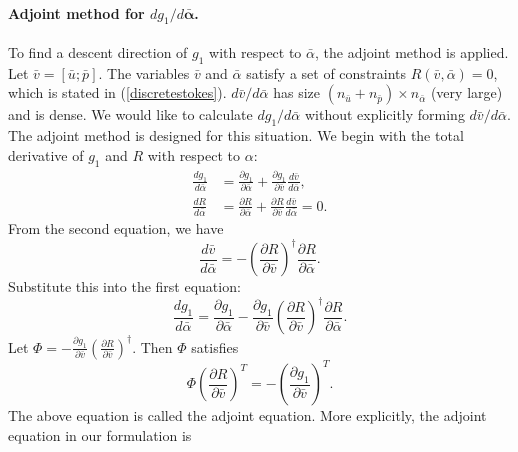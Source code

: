 \paragraph{Adjoint method for $d g_1/d \mathbf{\bar{\alpha}} $.}
To find a descent direction of $g_1$ with respect to $\bar{\alpha}$,
the adjoint method \cite{Jameson1999} is applied. Let $\bar{v} =
[\bar{u};\bar{p}]$. The variables $\bar{v}$ and $\bar{\alpha}$ satisfy
a set of constraints $R(\bar{v},\bar{\alpha})=0$, which is
stated in (\ref{discretestokes}). $d\bar{v}/d\bar{\alpha}$ has size
$(n_{\bar{u}}+n_{\bar{p}}) \times n_{\bar{\alpha}}$ (very large) and
is dense. We would like to calculate $d g_1/d\bar{\alpha}$ without
explicitly forming $d\bar{v}/d\bar{\alpha}$. The adjoint method is
designed for this situation. We begin with the total derivative of
$g_1$ and $R$ with respect to $\alpha$:
\begin{align*}
  \frac{dg_1}{d\bar{\alpha}} & =  \frac{\partial{g_1}}{\partial{\bar{\alpha}}}+
                                \frac{\partial{g_1}}{\partial{\bar{v}}} \frac{d\bar{v}}{d\bar{\alpha}},\\
  \frac{dR}{d\bar{\alpha}} & =  \frac{\partial{R}}{\partial{\bar{\alpha}}}+
                                 \frac{\partial{R}}{\partial{\bar{v}}} \frac{d\bar{v}}{d\bar{\alpha}}=0.
\end{align*}
From the second equation, we have
\begin{equation*}
  \frac{d\bar{v}}{d\bar{\alpha}}= -\left(\frac{\partial{R}}{\partial{\bar{v}}}\right)^{\dagger}\frac{\partial{R}}{\partial{\bar{\alpha}}}.
\end{equation*}
Substitute this into the first equation:
\begin{equation*}
   \frac{dg_1}{d\bar{\alpha}}  =  \frac{\partial{g_1}}{\partial{\bar{\alpha}}}-\frac{\partial{g_1}}{\partial{\bar{v}}} \left(\frac{\partial{R}}{\partial{\bar{v}}}\right)^{\dagger}\frac{\partial{R}}{\partial{\bar{\alpha}}}.
\end{equation*}
Let $\Phi = -\frac{\partial{g_1}}{\partial{\bar{v}}}
\left(\frac{\partial{R}}{\partial{\bar{v}}}\right)^{\dagger}$. Then
$\Phi$ satisfies
\begin{equation}
\label{adjointeq}
 \Phi \left(\frac{\partial{R}}{\partial{\bar{v}}}\right)^{T} = -\left({\frac{\partial{g_1}}{\partial{\bar{v}}}}\right)^T.
\end{equation}
The above equation is called the adjoint equation. More explicitly, the adjoint equation in our formulation is
